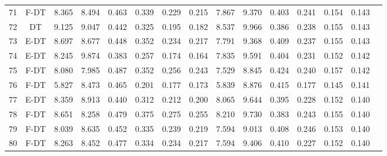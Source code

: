 \begin{longtable}{@{\hskip3pt}c@{\hskip3pt}c@{\hskip3pt}c@{\hskip3pt}c@{\hskip3pt}c@{\hskip3pt}c@{\hskip3pt}c@{\hskip3pt}c@{\hskip3pt}c@{\hskip3pt}c@{\hskip3pt}c@{\hskip3pt}c@{\hskip3pt}c@{\hskip3pt}c@{\hskip3pt}c}
         71 &           F-DT &             8.365 &       8.494 &         0.463 &       0.339 &       0.229 &        0.215 &               7.867 &       9.370 &         0.403 &       0.241 &       0.154 &        0.143 \\
         72 &             DT &             9.125 &       9.047 &         0.442 &       0.325 &       0.195 &        0.182 &               8.537 &       9.966 &         0.386 &       0.238 &       0.155 &        0.143 \\
         73 &           E-DT &             8.697 &       8.677 &         0.448 &       0.352 &       0.234 &        0.217 &               7.791 &       9.368 &         0.409 &       0.237 &       0.155 &        0.143 \\
         74 &           E-DT &             8.245 &       9.874 &         0.383 &       0.257 &       0.174 &        0.164 &               7.835 &       9.591 &         0.404 &       0.231 &       0.152 &        0.142 \\
         75 &           F-DT &             8.080 &       7.985 &         0.487 &       0.352 &       0.256 &        0.243 &               7.529 &       8.845 &         0.424 &       0.240 &       0.157 &        0.142 \\
         76 &           F-DT &             5.827 &       8.473 &         0.465 &       0.201 &       0.177 &        0.173 &               5.839 &       8.876 &         0.415 &       0.177 &       0.145 &        0.141 \\
         77 &           E-DT &             8.359 &       8.913 &         0.440 &       0.312 &       0.212 &        0.200 &               8.065 &       9.644 &         0.395 &       0.228 &       0.152 &        0.140 \\
         78 &           F-DT &             8.651 &       8.258 &         0.479 &       0.375 &       0.275 &        0.255 &               8.210 &       9.730 &         0.383 &       0.243 &       0.155 &        0.140 \\
         79 &           F-DT &             8.039 &       8.635 &         0.452 &       0.335 &       0.239 &        0.219 &               7.594 &       9.013 &         0.408 &       0.246 &       0.153 &        0.140 \\
         80 &           F-DT &             8.263 &       8.452 &         0.477 &       0.334 &       0.234 &        0.217 &               7.594 &       9.406 &         0.410 &       0.227 &       0.152 &        0.140 \\

\end{longtable}
